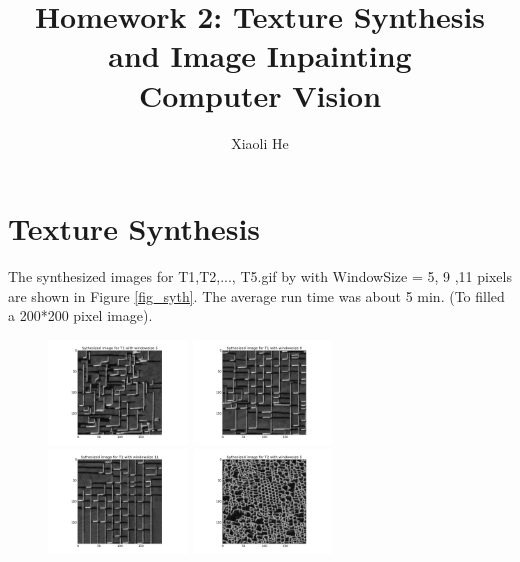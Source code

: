 \documentclass{extarticle}
\theoremstyle{definition}
\theoremstyle{definition}
\begin{document}
\title{Homework 2: Texture Synthesis and Image Inpainting \\
	Computer Vision}
\author{Xiaoli He}
\maketitle
\newpage

\section{Texture Synthesis}
The synthesized images for T1,T2,..., T5.gif by with WindowSize = 5, 9 ,11 pixels are shown in Figure \ref{fig_syth}. The average run time was about 5 min. (To filled a 200*200 pixel image).\\
\begin{figure}[H]
	\includegraphics[width = 0.33\textwidth]{./figures/Syth_T1_size_5.png}
	\includegraphics[width = 0.33\textwidth]{./figures/Syth_T1_size_9.png}
	\includegraphics[width = 0.33\textwidth]{./figures/Syth_T1_size_11.png}
	\includegraphics[width = 0.33\textwidth]{./figures/Syth_T2_size_5.png}

\end{figure}
\end{document}
